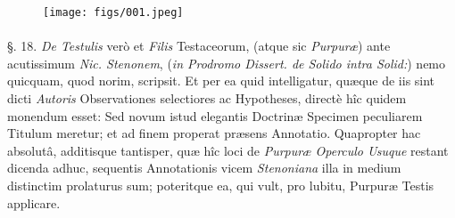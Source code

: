 \documentclass[a4paper, 11pt, oneside, polutonikogreek, german]{article}
\begin{document}
\begin{figure}[H]
\centering
\texttt{[image: figs/001.jpeg]}
\end{figure}
\paragraph{}
§. 18. \emph{De Testulis} verò et \emph{Filis} Testaceorum, (atque sic \emph{Purpuræ}) ante acutissimum \emph{Nic. Stenonem}, (\emph{in Prodromo Dissert. de Solido intra Solid:}) nemo quicquam, quod norim, scripsit. Et per ea quid intelligatur, quæque de iis sint dicti \emph{Autoris} Observationes selectiores ac Hypotheses, directè hîc quidem monendum esset: Sed novum istud elegantis Doctrinæ Specimen peculiarem Titulum meretur; et ad finem properat præsens Annotatio. Quapropter hac absolutâ, additisque tantisper, quæ hîc loci de \emph{Purpuræ Operculo Usuque} restant dicenda adhuc, sequentis Annotationis vicem \emph{Stenoniana} illa in medium distinctim prolaturus sum; poteritque ea, qui vult, pro lubitu, Purpuræ Testis applicare.
\end{document}

